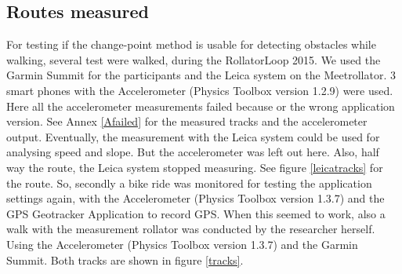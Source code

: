 
\subsection{Routes measured}
For testing if the change-point method is usable for detecting obstacles while walking, several test were walked, during the RollatorLoop 2015.
We used the Garmin Summit for the participants and the Leica system on the Meetrollator. 3 smart phones with the Accelerometer (Physics Toolbox version 1.2.9) were used. Here all the accelerometer measurements failed because or the wrong application version. See Annex \ref{Afailed} for the measured tracks and the accelerometer output. Eventually, the measurement with the Leica system could be used for analysing speed and slope. But the accelerometer was left out here. Also, half way the route, the Leica system stopped measuring. See figure \ref{leicatracks} for the route.
So, secondly a bike ride was monitored for testing the application settings again, with the Accelerometer (Physics Toolbox version 1.3.7) and the GPS Geotracker Application to record GPS. When this seemed to work, also a walk with the measurement rollator was conducted by the researcher herself. Using the Accelerometer (Physics Toolbox version 1.3.7) and the Garmin Summit. Both tracks are shown in figure \ref{tracks}.

